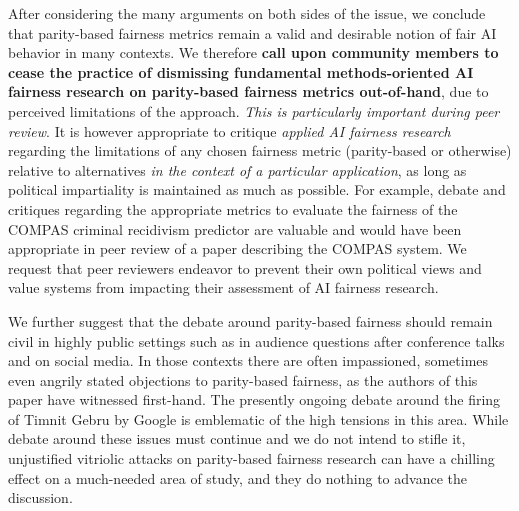 \documentclass[11pt,dvipdfm]{article}
\begin{document}
After considering the many arguments on both sides of the issue, we conclude that parity-based fairness metrics remain a valid and desirable notion of fair AI behavior in many 
contexts.  We therefore \textbf{call upon community members 
to cease the practice of dismissing fundamental methods-oriented AI fairness research on parity-based fairness metrics out-of-hand}, due to perceived limitations of the approach. \emph{This is particularly important during peer review}.  It is however appropriate to critique \emph{applied AI fairness research} 
regarding the limitations of any chosen fairness metric (parity-based or otherwise) relative to alternatives \emph{in the context of a particular application}, as long as political impartiality is maintained as much as possible.  For example, debate and critiques regarding the appropriate metrics to evaluate the fairness of the COMPAS criminal recidivism predictor \cite{angwin2016machine} are valuable and would have been appropriate in peer review of a paper describing the COMPAS system.  We request that peer reviewers endeavor to prevent their own political views and value systems from impacting their assessment of AI fairness research.

We further suggest that the debate around parity-based fairness  should remain civil in highly public settings such as in audience questions after conference talks and on social media.  In those contexts there are often impassioned, sometimes even angrily stated objections to parity-based fairness, as the authors of this paper have witnessed first-hand.  The presently ongoing debate around the firing of Timnit Gebru by Google is emblematic of the high tensions in this area.  While debate around these issues must continue and we do not intend to stifle it, unjustified vitriolic attacks on parity-based fairness research can have a chilling effect on a much-needed area of study, and they do nothing to advance the discussion. 
\end{document}
